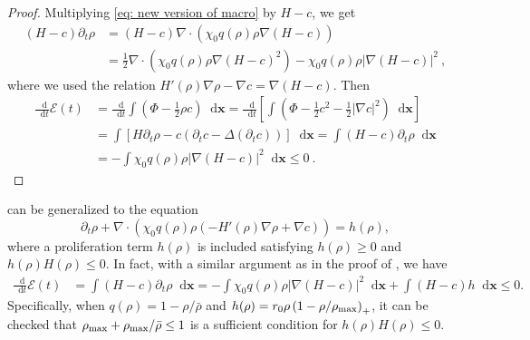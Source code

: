 \documentclass[review,onefignum,onetabnum]{siamart220329}
\newcommand {\bx} { {\mathbf{x}} }
\newcommand*\diff{\mathop{}\!\mathrm{d}}
\newcommand{\XR} {\color{red}}
\begin{document}
 
\begin{proof}
 Multiplying \cref{eq: new version of macro} by $H- c$, we get
\begin{align}
    (H-c)\partial_t\rho & =(H-c)\nabla\cdot(\chi_0 q(\rho)\rho\nabla(H-c))\nonumber\\ & = \frac{1}{2}\nabla\cdot\left( \chi_0 q(\rho)\rho\nabla(H-c)^2\right)-\chi_0 q(\rho)\rho|\nabla(H-c)|^2 \ ,\nonumber
\end{align}
where we used the relation $H'(\rho)\nabla\rho-\nabla c=\nabla(H-c)$.
Then
\begin{align*}
    \frac{\diff}{\diff t}\mathcal{E}(t) & = \frac{\diff }{\diff t}\int \left(\Phi-\frac{1}{2}\rho c \right)\diff \bx
    = \frac{\diff }{\diff t} \left[\int \left(\Phi-\frac{1}{2} c^2 -\frac{1}{2} |\nabla c|^2 \right)\diff \bx\right]\\
    & = \int\left[ H\partial_t\rho - c \left(\partial_t c - \Delta(\partial_t c)\right) \right] \diff \bx  = \int (H - c)\partial_t\rho \diff \bx \\
    &=-\int \chi_0 q(\rho)\rho|\nabla(H-c)|^2\diff \bx\leq 0\ .
\end{align*}
\end{proof}
\begin{remark}\label{rem 6}
 can be generalized to the equation 
\begin{equation*}
    \partial_t\rho+\nabla\cdot(\chi_0 q(\rho)\rho(-H'(\rho)\nabla\rho+\nabla c))=h(\rho),
\end{equation*}
{\XR where a proliferation term $h(\rho)$ is included satisfying $h(\rho)\ge0$ and $h(\rho)H(\rho)\le0$. 
In fact, with a similar argument as in the proof of , we have 
\begin{align*}
    \frac{\diff}{\diff t}\mathcal{E}(t) & = \int (H - c)\partial_t\rho \diff \bx 
    =-\int \chi_0 q(\rho)\rho|\nabla(H-c)|^2\diff \bx + \int (H-c) h \diff \bx \le 0.
\end{align*}
Specifically, when $q(\rho) = 1 - \rho / \bar{\rho}$ and $h(\rho) = r_0 \rho\left(1 - \rho/\rho_{\rm max}\right)_+$, it can be checked that $\rho_{\rm max} + \rho_{\rm max} / \bar{\rho} \le1$ is a sufficient condition for  $h(\rho)H(\rho)\le0$. }
\end{remark}
\end{document}
